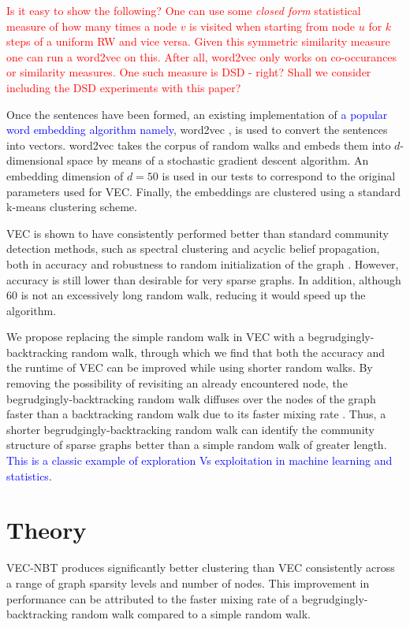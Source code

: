 \documentclass{article} %
\begin{document}
\textcolor{red}{Is it easy to show the following? One can use some \emph{closed form} statistical measure of how many times a node $v$ is visited when starting from node $u$ for $k$ steps of a uniform RW and vice versa. Given this symmetric similarity measure one can run a word2vec on this. After all, word2vec only works on co-occurances or similarity measures. One such measure is DSD - right? Shall we consider including the DSD experiments with this paper?}

Once the sentences have been formed, an existing implementation of \textcolor{blue}{a popular word embedding algorithm namely}, word2vec \cite{word2vec}, is used to convert the sentences into vectors. word2vec takes the corpus of random walks and embeds them into $d$-dimensional space by means of a stochastic gradient descent algorithm. An embedding dimension of $d=50$ is used in our tests to correspond to the original parameters used for VEC. Finally, the embeddings are clustered using a standard k-means clustering scheme.

VEC is shown to have consistently performed better than standard community detection methods, such as spectral clustering and acyclic belief propagation, both in accuracy and robustness to random initialization of the graph \cite{NodeEmbed}. However, accuracy is still lower than desirable for very sparse graphs. In addition, although 60 is not an excessively long random walk, reducing it would speed up the algorithm.

We propose replacing the simple random walk in VEC with a begrudgingly-backtracking random walk, through which we find that both the accuracy and the runtime of VEC can be improved while using shorter random walks. By removing the possibility of revisiting an already encountered node, the begrudgingly-backtracking random walk diffuses over the nodes of the graph faster than a backtracking random walk due to its faster mixing rate \cite{Alon,NBT-Ihara}. Thus, a shorter begrudgingly-backtracking random walk can identify the community structure of sparse graphs better than a simple random walk of greater length. \textcolor{blue}{This is a classic example of exploration Vs exploitation in machine learning and statistics}.

\section{Theory}

VEC-NBT produces significantly better clustering than VEC consistently across a range of graph sparsity levels and number of nodes. This improvement in performance can be attributed to the faster mixing rate of a begrudgingly-backtracking random walk compared to a simple random walk.
\end{document}
